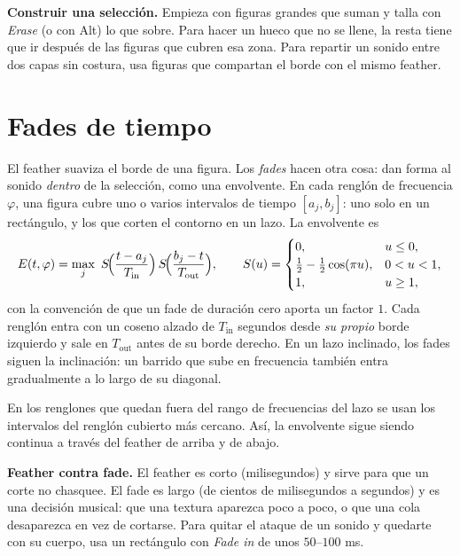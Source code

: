 \begin{estudio}
\textbf{Construir una selección.} Empieza con figuras grandes que suman y talla con \emph{Erase}
(o con Alt) lo que sobre. Para hacer un hueco que no se llene, la resta tiene que ir después de
las figuras que cubren esa zona. Para repartir un sonido entre dos capas sin costura, usa figuras
que compartan el borde con el mismo feather.
\end{estudio}

\section{Fades de tiempo}\label{sec:fades}

El feather suaviza el borde de una figura. Los \emph{fades} hacen otra cosa: dan forma al sonido
\emph{dentro} de la selección, como una envolvente. En cada renglón de frecuencia $\varphi$, una
figura cubre uno o varios intervalos de tiempo $[a_j,b_j]$: uno solo en un rectángulo, y los que
corten el contorno en un lazo. La envolvente es
\[
  E(t,\varphi)=\max_j\ S\!\Bigl(\frac{t-a_j}{T_{\text{in}}}\Bigr)\,S\!\Bigl(\frac{b_j-t}{T_{\text{out}}}\Bigr),
  \qquad S(u)=\begin{cases}0,&u\le0,\\ \tfrac12-\tfrac12\cos(\pi u),&0<u<1,\\ 1,&u\ge1,\end{cases}
\]
con la convención de que un fade de duración cero aporta un factor $1$. Cada renglón entra con un
coseno alzado de $T_{\text{in}}$ segundos desde \emph{su propio} borde izquierdo y sale en
$T_{\text{out}}$ antes de su borde derecho. En un lazo inclinado, los fades siguen la inclinación:
un barrido que sube en frecuencia también entra gradualmente a lo largo de su diagonal.

En los renglones que quedan fuera del rango de frecuencias del lazo se usan los intervalos del
renglón cubierto más cercano. Así, la envolvente sigue siendo continua a través del feather de
arriba y de abajo.

\begin{estudio}
\textbf{Feather contra fade.} El feather es corto (milisegundos) y sirve para que un corte no
chasquee. El fade es largo (de cientos de milisegundos a segundos) y es una decisión musical: que
una textura aparezca poco a poco, o que una cola desaparezca en vez de cortarse. Para quitar el
ataque de un sonido y quedarte con su cuerpo, usa un rectángulo con \emph{Fade in} de unos
$50$--$100$ ms.
\end{estudio}

